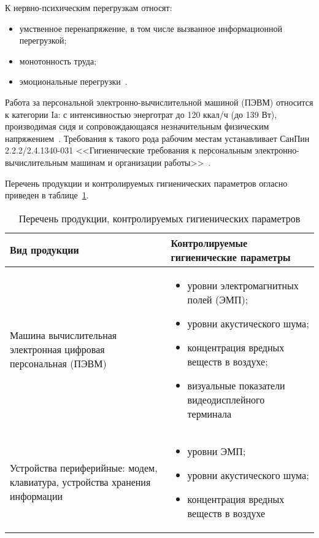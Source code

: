 К нервно-психическим перегрузкам относят:
\begin{itemize}
 \item умственное перенапряжение, в том числе вызванное информационной перегрузкой;
 \item монотонность труда;
 \item эмоциональные перегрузки~\cite{gost_12.0.003-2015}.
\end{itemize}

Работа за персональной электронно-вычислительной машиной 
(ПЭВМ) относится к категории Iа: с интенсивностью энерготрат до 120 ккал/ч (до
139 Вт), производимая сидя и сопровождающаяся незначительным физическим напряжением~\cite{sanpin_mikroclimate}.
Требования к такого рода рабочим местам устанавливает СанПин 2.2.2/2.4.1340-031 
<<Гигиенические требования к персональным электронно-вычислительным машинам
и организации работы>>~\cite{sanpin_2.4.1340-03}. 

Перечень продукции и контролируемых гигиенических параметров огласно~\cite{sanpin_2.4.1340-03} 
приведен в таблице~\ref{tab:life_1}.

\begin{table}[h!]
\caption{ Перечень продукции, контролируемых гигиенических параметров }
\label{tab:life_1}
\begin{center}
\begin{tabularx}{\linewidth}{|X|X|}
\hline
Вид продукции & Контролируемые гигиенические параметры\\
\hline
\item Машина вычислительная электронная цифровая персональная (ПЭВМ) & 
\begin{itemize}
 \item уровни электромагнитных полей (ЭМП);
 \item уровни акустического шума;
 \item концентрация вредных веществ в воздухе;
 \item визуальные показатели видеодисплейного терминала
\end{itemize}									     
\\
\hline
\item Устройства периферийные: модем, клавиатура, устройства хранения информации & 
\begin{itemize}
 \item уровни ЭМП;
 \item уровни акустического шума;
 \item концентрация вредных веществ в воздухе
\end{itemize}
 \\
\hline
\end{tabularx}
\end{center}
\end{table}


